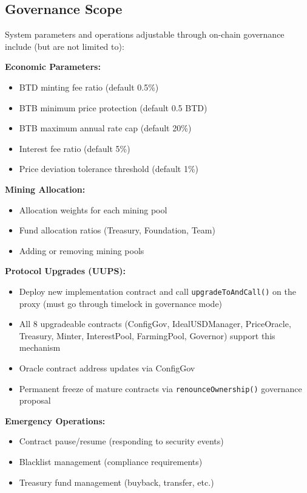 \documentclass{article}
\begin{document}
\subsection{Governance Scope}

System parameters and operations adjustable through on-chain governance include (but are not limited to):

\textbf{Economic Parameters:}
\begin{itemize}
  \item BTD minting fee ratio (default 0.5\%)
  \item BTB minimum price protection (default 0.5 BTD)
  \item BTB maximum annual rate cap (default 20\%)
  \item Interest fee ratio (default 5\%)
  \item Price deviation tolerance threshold (default 1\%)
\end{itemize}

\textbf{Mining Allocation:}
\begin{itemize}
  \item Allocation weights for each mining pool
  \item Fund allocation ratios (Treasury, Foundation, Team)
  \item Adding or removing mining pools
\end{itemize}

\textbf{Protocol Upgrades (UUPS):}
\begin{itemize}
  \item Deploy new implementation contract and call \texttt{upgradeToAndCall()} on the proxy (must go through timelock in governance mode)
  \item All 8 upgradeable contracts (ConfigGov, IdealUSDManager, PriceOracle, Treasury, Minter, InterestPool, FarmingPool, Governor) support this mechanism
  \item Oracle contract address updates via ConfigGov
  \item Permanent freeze of mature contracts via \texttt{renounceOwnership()} governance proposal
\end{itemize}

\textbf{Emergency Operations:}
\begin{itemize}
  \item Contract pause/resume (responding to security events)
  \item Blacklist management (compliance requirements)
  \item Treasury fund management (buyback, transfer, etc.)
\end{itemize}
\end{document}
